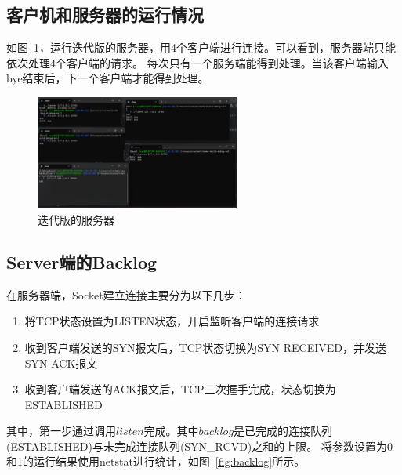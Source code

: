 \documentclass[a4paper,twoside]{article}
\begin{document}
\begin{spacing}{1.2}
\subsection{客户机和服务器的运行情况}

如图~\ref{fig:iter}，运行迭代版的服务器，用4个客户端进行连接。可以看到，服务器端只能依次处理4个客户端的请求。
每次只有一个服务端能得到处理。当该客户端输入bye结束后，下一个客户端才能得到处理。

\begin{figure}[htb]
	\centering
	\caption{迭代版的服务器}
	\label{fig:iter}
	\includegraphics[width=0.6\textwidth]{server_iter.png}
\end{figure}

\subsection{Server端的Backlog}

在服务器端，Socket建立连接主要分为以下几步：

\begin{enumerate}
	\item 将TCP状态设置为LISTEN状态，开启监听客户端的连接请求
	\item 收到客户端发送的SYN报文后，TCP状态切换为SYN RECEIVED，并发送SYN ACK报文
	\item 收到客户端发送的ACK报文后，TCP三次握手完成，状态切换为ESTABLISHED
\end{enumerate}

其中，第一步通过调用$listen$完成。其中$backlog$是已完成的连接队列(ESTABLISHED)与未完成连接队列(SYN\_RCVD)之和的上限。
将参数设置为0和1的运行结果使用netstat进行统计，如图~\ref{fig:backlog}所示。



\end{spacing}
\end{document}
